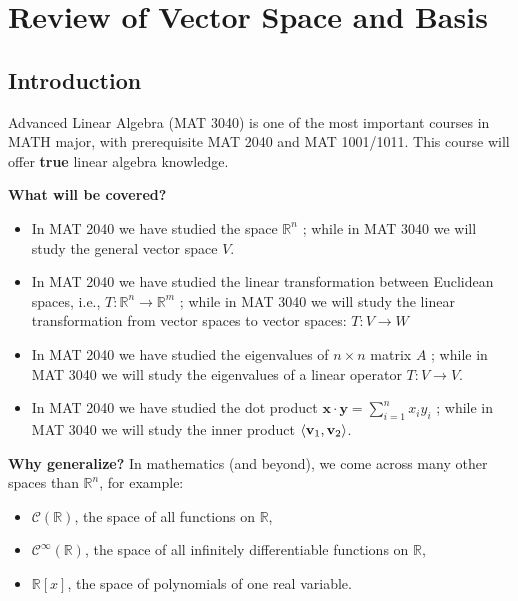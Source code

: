 \chapter{Review of Vector Space and Basis}

\section{Introduction}

Advanced Linear Algebra (MAT 3040) is one of the most important courses in MATH major, with prerequisite MAT 2040 and MAT 1001/1011. This course will offer {\bf true} linear algebra knowledge. 

\medskip

{\bf What will be covered?}
\begin{itemize}
\item In MAT 2040 we have studied the space \({\mathbb{R}}^n\) ; while in MAT 3040 we will study the general vector space \(V\).

\item In MAT 2040 we have studied the linear transformation between Euclidean spaces, i.e., \(T : {\mathbb{R}}^n \rightarrow  {\mathbb{R}}^{m}\) ; while in MAT 3040 we will study the linear transformation from vector spaces to vector spaces: \(T : V \rightarrow  W\)

\item In MAT 2040 we have studied the eigenvalues of \(n \times  n\) matrix \(A\) ; while in MAT 3040 we will study the eigenvalues of a linear operator \(T : V \rightarrow  V\).

\item In MAT 2040 we have studied the dot product \(\mathbf{x} \cdot  \mathbf{y} = \mathop{\sum }\limits_{{i = 1}}^n{x}_{i}{y}_{i}\) ; while in MAT 3040 we will study the inner product \(\left\langle  {{\bf v}_1,{\bf v}_2}\right\rangle\).
\end{itemize}

{\bf Why generalize?} In mathematics (and beyond), we come across many other spaces than $\mathbb{R}^n$, for example:
\begin{itemize}
\item \(\mathcal{C}\left( \mathbb{R}\right)\), the space of all functions on \(\mathbb{R}\),
\item \({\mathcal{C}}^{\infty }\left( \mathbb{R}\right)\), the space of all infinitely differentiable functions on \(\mathbb{R}\),
\item \(\mathbb{R}[x]\), the space of polynomials of one real variable.
\end{itemize}

